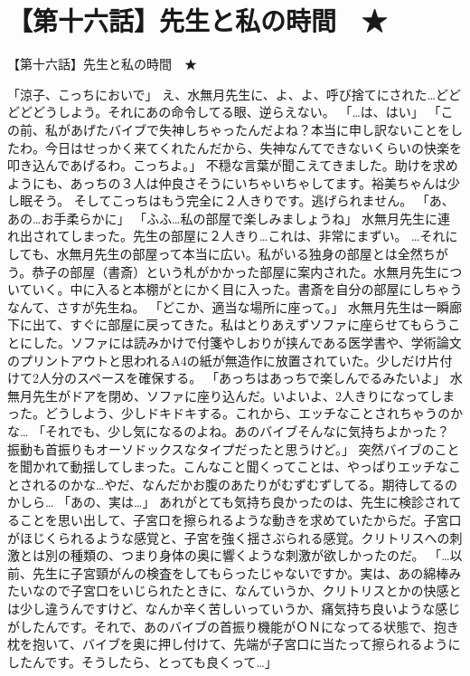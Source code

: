 \section{【第十六話】先生と私の時間　★}
【第十六話】先生と私の時間　★

「涼子、こっちにおいで」
え、水無月先生に、よ、よ、呼び捨てにされた…どどどどどうしよう。それにあの命令してる眼、逆らえない。
「…は、はい」
「この前、私があげたバイブで失神しちゃったんだよね？本当に申し訳ないことをしたわ。今日はせっかく来てくれたんだから、失神なんてできないくらいの快楽を叩き込んであげるわ。こっちよ。」
不穏な言葉が聞こえてきました。助けを求めようにも、あっちの３人は仲良さそうにいちゃいちゃしてます。裕美ちゃんは少し眠そう。
そしてこっちはもう完全に２人きりです。逃げられません。
「あ、あの…お手柔らかに」
「ふふ…私の部屋で楽しみましょうね」
水無月先生に連れ出されてしまった。先生の部屋に２人きり…これは、非常にまずい。
…それにしても、水無月先生の部屋って本当に広い。私がいる独身の部屋とは全然ちがう。恭子の部屋（書斎）という札がかかった部屋に案内された。水無月先生についていく。中に入ると本棚がとにかく目に入った。書斎を自分の部屋にしちゃうなんて、さすが先生ね。
「どこか、適当な場所に座って。」
水無月先生は一瞬廊下に出て、すぐに部屋に戻ってきた。私はとりあえずソファに座らせてもらうことにした。ソファには読みかけで付箋やしおりが挟んである医学書や、学術論文のプリントアウトと思われるA4の紙が無造作に放置されていた。少しだけ片付けて2人分のスペースを確保する。
「あっちはあっちで楽しんでるみたいよ」
水無月先生がドアを閉め、ソファに座り込んだ。いよいよ、2人きりになってしまった。どうしよう、少しドキドキする。これから、エッチなことされちゃうのかな…
「それでも、少し気になるのよね。あのバイブそんなに気持ちよかった？ 振動も首振りもオーソドックスなタイプだったと思うけど。」
突然バイブのことを聞かれて動揺してしまった。こんなこと聞くってことは、やっぱりエッチなことされるのかな…やだ、なんだかお腹のあたりがむずむずしてる。期待してるのかしら…
「あの、実は…」
あれがとても気持ち良かったのは、先生に検診されてることを思い出して、子宮口を擦られるような動きを求めていたからだ。子宮口がほじくられるような感覚と、子宮を強く揺さぶられる感覚。クリトリスへの刺激とは別の種類の、つまり身体の奥に響くような刺激が欲しかったのだ。
「…以前、先生に子宮頸がんの検査をしてもらったじゃないですか。実は、あの綿棒みたいなので子宮口をいじられたときに、なんていうか、クリトリスとかの快感とは少し違うんですけど、なんか辛く苦しいっていうか、痛気持ち良いような感じがしたんです。それで、あのバイブの首振り機能がＯＮになってる状態で、抱き枕を抱いて、バイブを奥に押し付けて、先端が子宮口に当たって擦られるようにしたんです。そうしたら、とっても良くって…」
